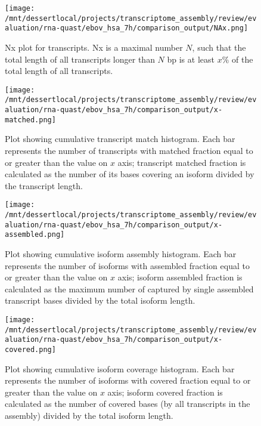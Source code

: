 \documentclass[12pt,a4paper]{article}
\begin{document}
\begin{figure}[t]
\centering
\texttt{[image: /mnt/dessertlocal/projects/transcriptome\_assembly/review/evaluation/rna-quast/ebov\_hsa\_7h/comparison\_output/NAx.png]}
\caption{Nx plot for transcripts. Nx is a maximal number $N$, such that the total length of all transcripts longer than $N$ bp is at least $x\%$ of the total length of all transcripts.}
\end{figure}
\FloatBarrier
\clearpage


\begin{figure}[t]
\centering
\texttt{[image: /mnt/dessertlocal/projects/transcriptome\_assembly/review/evaluation/rna-quast/ebov\_hsa\_7h/comparison\_output/x-matched.png]}
\caption{Plot showing cumulative transcript match histogram. Each bar represents the number of transcripts with matched fraction equal to or greater than the value on $x$ axis; transcript matched fraction is calculated as the number of its bases covering an isoform divided by the transcript length.}
\end{figure}
\FloatBarrier
\clearpage


\begin{figure}[t]
\centering
\texttt{[image: /mnt/dessertlocal/projects/transcriptome\_assembly/review/evaluation/rna-quast/ebov\_hsa\_7h/comparison\_output/x-assembled.png]}
\caption{Plot showing cumulative isoform assembly histogram. Each bar represents the number of isoforms with assembled fraction equal to or greater than the value on $x$ axis; isoform assembled fraction is calculated as the maximum number of captured by single assembled transcript bases divided by the total isoform length.}
\end{figure}
\FloatBarrier
\clearpage


\begin{figure}[t]
\centering
\texttt{[image: /mnt/dessertlocal/projects/transcriptome\_assembly/review/evaluation/rna-quast/ebov\_hsa\_7h/comparison\_output/x-covered.png]}
\caption{Plot showing cumulative isoform coverage histogram. Each bar represents the number of isoforms with covered fraction equal to or greater than the value on $x$ axis; isoform covered fraction is calculated as the number of covered bases (by all transcripts in the assembly) divided by the total isoform length.}
\end{figure}
\FloatBarrier
\clearpage
\end{document}
